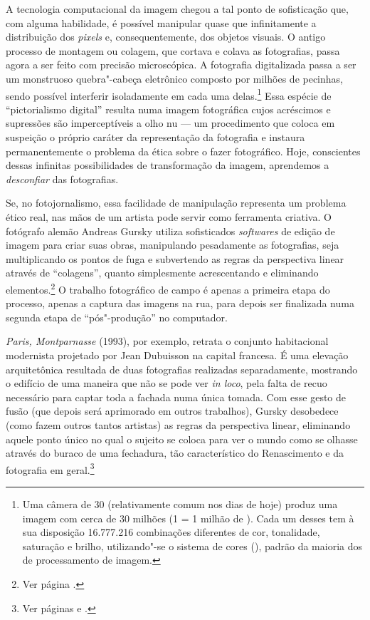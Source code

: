 A tecnologia computacional da imagem chegou a tal ponto de sofisticação
que, com alguma habilidade, é possível manipular quase que infinitamente
a distribuição dos \emph{pixels} e, consequentemente, dos objetos
visuais. O antigo processo de montagem ou colagem, que cortava e colava
as fotografias, passa agora a ser feito com precisão microscópica. A
fotografia digitalizada passa a ser um monstruoso quebra"-cabeça
eletrônico composto por milhões de pecinhas, sendo possível interferir
isoladamente em cada uma delas.\footnote{Uma câmera de 30
  {} (relativamente comum nos dias de hoje) produz uma
  imagem com cerca de 30 milhões {} (1 {} = 1
  milhão de {}). Cada um desses {} tem à sua
  disposição 16.777.216 combinações diferentes de cor, tonalidade,
  saturação e brilho, utilizando"-se o sistema de cores  ({}), padrão da maioria dos {} de processamento
  de imagem.} Essa espécie de ``pictorialismo digital'' resulta numa
imagem fotográfica cujos acréscimos e supressões são imperceptíveis a
olho nu --- um procedimento que coloca em suspeição o próprio caráter da
representação da fotografia e instaura permanentemente o problema da
ética sobre o fazer fotográfico. Hoje, conscientes dessas infinitas
possibilidades de transformação da imagem, aprendemos a
\emph{desconfiar} das fotografias.

Se, no fotojornalismo, essa facilidade de manipulação representa um
problema ético real, nas mãos de um artista pode servir como ferramenta
criativa. O fotógrafo alemão Andreas Gursky utiliza sofisticados
\emph{softwares} de edição de imagem para criar suas obras, manipulando
pesadamente as fotografias, seja multiplicando os pontos de fuga e
subvertendo as regras da perspectiva linear através de ``colagens'',
quanto simplesmente acrescentando e eliminando elementos.\footnote{Ver
  página \pageref{canaletto}.} O trabalho fotográfico de
campo é apenas a primeira etapa do processo, apenas a captura das
imagens na rua, para depois ser finalizada numa segunda etapa de
``pós"-produção'' no computador.

\emph{Paris, Montparnasse} (1993), por exemplo, retrata o conjunto
habitacional modernista projetado por Jean Dubuisson na capital
francesa. É uma elevação arquitetônica resultada de duas fotografias
realizadas separadamente, mostrando o edifício de uma maneira que não se
pode ver \emph{in loco}, pela falta de recuo necessário para captar toda
a fachada numa única tomada. Com esse gesto de fusão (que depois será
aprimorado em outros trabalhos), Gursky desobedece (como fazem outros
tantos artistas) as regras da perspectiva linear, eliminando aquele
ponto único no qual o sujeito se coloca para ver o mundo como se olhasse
através do buraco de uma fechadura, tão característico do Renascimento e
da fotografia em geral.\footnote{Ver páginas \pageref{perspectiva} e \pageref{automatica}.}

